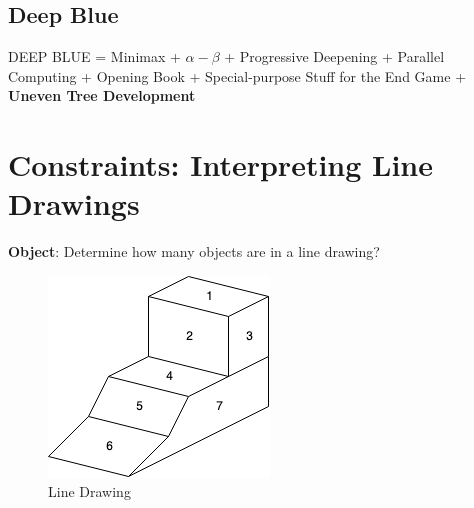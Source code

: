 \documentclass[12pt]{book}
\begin{document}
\subsection{Deep Blue}
DEEP BLUE =   Minimax + $\alpha - \beta$ + Progressive Deepening + Parallel Computing + Opening Book + Special-purpose Stuff for the End Game + \textbf{Uneven Tree Development}
\newpage

\section{Constraints: Interpreting Line Drawings}
\indent \textbf{Object}: Determine how many objects are in a line drawing?
\begin{figure}[ht]
	\centering
	\includegraphics[scale=0.6]{Figure/Figure7_1.png}
	\caption{Line Drawing}
\end{figure}
\end{document}
